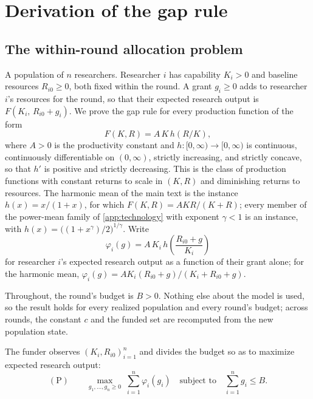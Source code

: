 \section{Derivation of the gap rule}\label{app:gap-rule}

\subsection*{The within-round allocation problem}

A population of $n$ researchers. Researcher $i$ has capability $K_i > 0$ and baseline resources $R_{i0} \geq 0$, both fixed within the round. A grant $g_i \geq 0$ adds to researcher $i$'s resources for the round, so that their expected research output is $F(K_i,\, R_{i0} + g_i)$. We prove the gap rule for every production function of the form
\[
F(K, R) = A\,K\,h(R/K),
\]
where $A > 0$ is the productivity constant and $h\colon [0, \infty) \to [0, \infty)$ is continuous, continuously differentiable on $(0, \infty)$, strictly increasing, and strictly concave, so that $h'$ is positive and strictly decreasing. This is the class of production functions with constant returns to scale in $(K, R)$ and diminishing returns to resources. The harmonic mean of the main text is the instance $h(x) = x/(1 + x)$, for which $F(K, R) = AKR/(K + R)$; every member of the power-mean family of \ref{app:technology} with exponent $\gamma < 1$ is an instance, with $h(x) = \big((1 + x^{\gamma})/2\big)^{1/\gamma}$. Write
\[
\varphi_i(g) = A\,K_i\,h\!\left(\frac{R_{i0} + g}{K_i}\right)
\]
for researcher $i$'s expected research output as a function of their grant alone; for the harmonic mean, $\varphi_i(g) = A K_i (R_{i0} + g)/(K_i + R_{i0} + g)$.

Throughout, the round's budget is $B > 0$. Nothing else about the model is used, so the result holds for every realized population and every round's budget; across rounds, the constant $c$ and the funded set are recomputed from the new population state.

The funder observes $(K_i, R_{i0})_{i=1}^n$ and divides the budget so as to maximize expected research output:
\[
(\mathrm{P}) \qquad \max_{g_1, \ldots, g_n \geq 0} \; \sum_{i=1}^n \varphi_i(g_i) \quad \text{subject to} \quad \sum_{i=1}^n g_i \leq B.
\]

